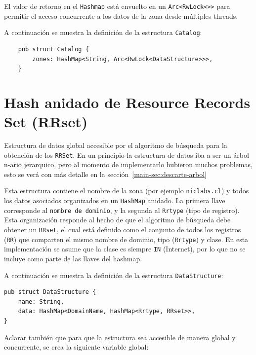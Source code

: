 El valor de retorno en el \texttt{Hashmap} está envuelto en un \verb|Arc<RwLock<>>| para permitir el acceso concurrente a los datos de la zona desde múltiples threads.

A continuación se muestra la definición de la estructura \texttt{Catalog}:\\

\begin{lstlisting}
    pub struct Catalog {
        zones: HashMap<String, Arc<RwLock<DataStructure>>>, 
    }
\end{lstlisting}

\newpage

\section{Hash anidado de Resource Records Set (RRset)}\label{sec:hash-anidado-rrset}

Estructura de datos global accesible por el algoritmo de búsqueda para la obtención de los \texttt{RRSet}. En un principio 
la estructura de datos iba a ser un árbol n-ario jerarquico, pero al momento de implementarlo hubieron muchos problemas, 
esto se verá con más detalle en la sección~\ref{main-sec:descarte-arbol}



Esta estructura contiene el nombre de la zona (por ejemplo \texttt{niclabs.cl}) y todos los datos asociados organizados en un \texttt{HashMap} anidado. 
La primera llave corresponde al \texttt{nombre de dominio}, y la segunda al \texttt{Rrtype} (tipo de registro). Esta organización responde al hecho de que el algoritmo de 
búsqueda debe obtener un \texttt{RRset}, el cual está definido como el conjunto de todos los registros (\texttt{RR}) que comparten el mismo nombre de dominio, 
tipo (\texttt{Rrtype}) y clase. En esta implementación se asume que la clase es siempre \texttt{IN} (Internet), por lo que no se incluye como parte de las llaves del hashmap.

A continuación se muestra la definición de la estructura \texttt{DataStructure}:\\

\begin{lstlisting}
pub struct DataStructure {
    name: String,
    data: HashMap<DomainName, HashMap<Rrtype, RRset>>,
}
\end{lstlisting}

Aclarar también que para que la estructura sea accesible de manera global y concurrente, se crea la siguiente variable global:\\

